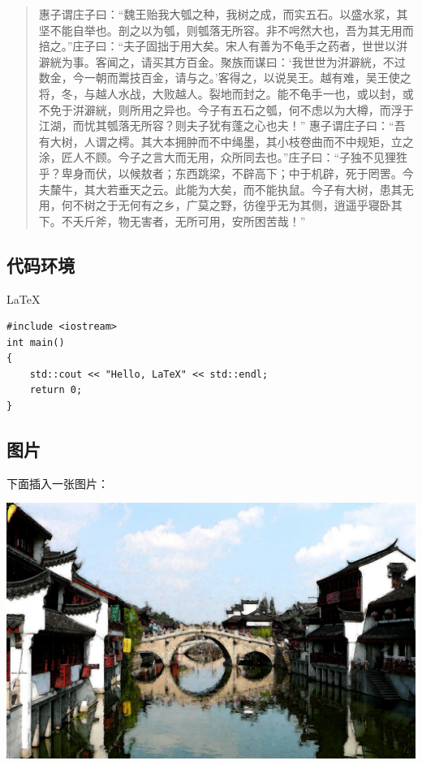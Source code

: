 \documentclass[utf8]{book}
\begin{document}
\begin{quotation}
			惠子谓庄子曰：“魏王贻我大瓠之种，我树之成，而实五石。以盛水浆，其坚不能自举也。剖之以为瓠，则瓠落无所容。非不呺然大也，吾为其无用而掊之。”庄子曰：“夫子固拙于用大矣。宋人有善为不龟手之药者，世世以洴澼絖为事。客闻之，请买其方百金。聚族而谋曰：‘我世世为洴澼絖，不过数金，今一朝而鬻技百金，请与之。’客得之，以说吴王。越有难，吴王使之将，冬，与越人水战，大败越人。裂地而封之。能不龟手一也，或以封，或不免于洴澼絖，则所用之异也。今子有五石之瓠，何不虑以为大樽，而浮于江湖，而忧其瓠落无所容？则夫子犹有蓬之心也夫！”
			惠子谓庄子曰：“吾有大树，人谓之樗。其大本拥肿而不中绳墨，其小枝卷曲而不中规矩，立之涂，匠人不顾。今子之言大而无用，众所同去也。”庄子曰：“子独不见狸狌乎？卑身而伏，以候敖者；东西跳梁，不辟高下；中于机辟，死于罔罟。今夫斄牛，其大若垂天之云。此能为大矣，而不能执鼠。今子有大树，患其无用，何不树之于无何有之乡，广莫之野，彷徨乎无为其侧，逍遥乎寝卧其下。不夭斤斧，物无害者，无所可用，安所困苦哉！”
		\end{quotation}
	\subsection{代码环境}LaTeX
		\begin{verbatim}
#include <iostream>
int main()
{
	std::cout << "Hello, LaTeX" << std::endl;
	return 0;
}
		\end{verbatim}
	
		\subsection{图片}
			下面插入一张图片：
			
			\includegraphics[scale=0.1]{house.jpeg}
			
\end{document}
